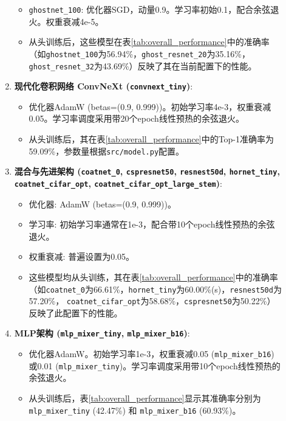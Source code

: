 \documentclass[a4paper]{article}
\begin{document}
\begin{description}
\begin{enumerate}
\begin{itemize}
        \item \texttt{ghostnet\_100}: 优化器SGD，动量0.9。学习率初始0.1，配合余弦退火。权重衰减4e-5。
        \item 从头训练后，这些模型在表\ref{tab:overall_performance}中的准确率（如\texttt{ghostnet\_100}为56.94\%，\texttt{ghost\_resnet\_20}为35.16\%，\texttt{ghost\_resnet\_32}为43.69\%）反映了其在当前配置下的性能。
    \end{itemize}
    \item \textbf{现代化卷积网络 ConvNeXt (\texttt{convnext\_tiny})}:
    \begin{itemize}
        \item 优化器AdamW (betas=(0.9, 0.999))。初始学习率4e-3，权重衰减0.05。学习率调度采用带20个epoch线性预热的余弦退火。
        \item 从头训练后，其在表\ref{tab:overall_performance}中的Top-1准确率为59.09\%，参数量根据\texttt{src/model.py}配置。
    \end{itemize}
    \item \textbf{混合与先进架构 (\texttt{coatnet\_0}, \texttt{cspresnet50}, \texttt{resnest50d}, \texttt{hornet\_tiny}, \texttt{coatnet\_cifar\_opt}, \texttt{coatnet\_cifar\_opt\_large\_stem})}:
    \begin{itemize}
        \item 优化器: AdamW (betas=(0.9, 0.999))。
        \item 学习率: 初始学习率通常在1e-3，配合带10个epoch线性预热的余弦退火。
        \item 权重衰减: 普遍设置为0.05。
        \item 这些模型均从头训练，其在表\ref{tab:overall_performance}中的准确率（如\texttt{coatnet\_0}为66.61\%，\texttt{hornet\_tiny}为60.00\%(s)，\texttt{resnest50d}为57.20\%， \texttt{coatnet\_cifar\_opt}为58.68\%，\texttt{cspresnet50}为50.22\%）反映了此配置下的性能。
    \end{itemize}
    \item \textbf{MLP架构 (\texttt{mlp\_mixer\_tiny}, \texttt{mlp\_mixer\_b16})}:
    \begin{itemize}
        \item 优化器AdamW。初始学习率1e-3，权重衰减0.05 (\texttt{mlp\_mixer\_b16}) 或0.01 (\texttt{mlp\_mixer\_tiny})。学习率调度采用带10个epoch线性预热的余弦退火。
        \item 从头训练后，表\ref{tab:overall_performance}显示其准确率分别为 \texttt{mlp\_mixer\_tiny} (42.47\%) 和 \texttt{mlp\_mixer\_b16} (60.93\%)。
    \end{itemize}

\end{enumerate}
\end{description}
\end{document}
